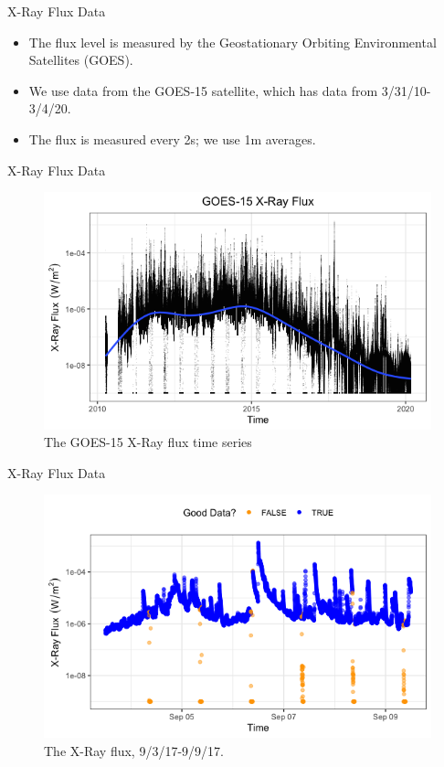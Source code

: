\documentclass{beamer}
\begin{document}
\begin{frame}{X-Ray Flux Data}
    \begin{itemize}
        \item The flux level is measured by the Geostationary Orbiting Environmental Satellites (GOES).
        \item We use data from the GOES-15 satellite, which has data from 3/31/10-3/4/20.
        \item The flux is measured every 2s; we use 1m averages.
    \end{itemize}
\end{frame}

\begin{frame}{X-Ray Flux Data}
    \begin{figure}
        \centering
        \includegraphics[scale=0.5]{flux_time_series.png}
        \caption{The GOES-15 X-Ray flux time series}
        \label{fig:flux_time_series}
    \end{figure}
\end{frame}

\begin{frame}{X-Ray Flux Data}
    \begin{figure}
        \centering
        \includegraphics[scale=0.5]{flux_20170906.png}
        \caption{The X-Ray flux, 9/3/17-9/9/17.}
        \label{fig:flux_20170906}
    \end{figure}
\end{frame}
\end{document}
